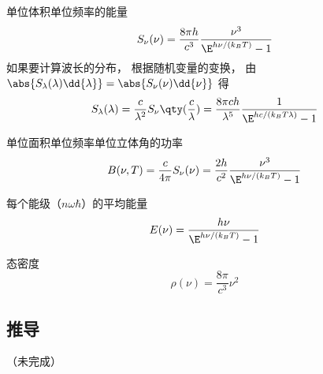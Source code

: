 
单位体积单位频率的能量
\begin{equation}
S_\nu(\nu) = \frac{8\pi h}{c^3}\frac{\nu^3}{\E^{h\nu/(k_B T)} - 1}
\end{equation}
如果要计算波长的分布， 根据随机变量的变换， 由 $\abs{S_\lambda(\lambda) \dd{\lambda}} = \abs{S_\nu(\nu)\dd{\nu}}$ 得
\begin{equation}\label{BBdLaw_eq1}
S_\lambda(\lambda) = \frac{c}{\lambda^2}S_\nu\qty(\frac{c}{\lambda}) =
\frac{8\pi ch}{\lambda^5} \frac{1}{\E^{hc/(k_B T\lambda)} - 1}
\end{equation}

单位面积单位频率单位立体角的功率
\begin{equation}
B(\nu, T) = \frac{c}{4\pi}S_\nu(\nu) = \frac{2h}{c^2} \frac{\nu^3}{\E^{h\nu/(k_B T)} - 1}
\end{equation}



每个能级（$n\omega\hbar$）的平均能量
\begin{equation}
E(\nu) = \frac{h\nu}{\E^{h\nu/(k_B T)} - 1}
\end{equation}

态密度
\begin{equation}
\rho(\nu) = \frac{8\pi}{c^3}\nu^2
\end{equation}

\subsection{推导}
（未完成）
